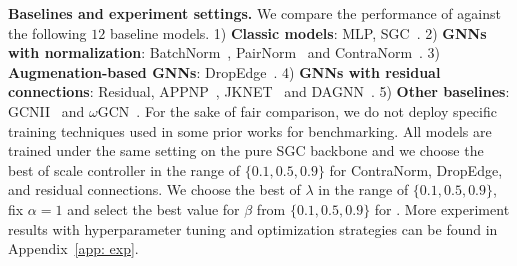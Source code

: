 \textbf{Baselines and experiment settings.}
We compare the performance of \ours against the following $12$ baseline models. 
1) \textbf{Classic models}: MLP, SGC~\citep{sgc}.
2) \textbf{GNNs with normalization}: BatchNorm~\citep{batchnorm}, PairNorm~\citep{pairnorm} and ContraNorm~\citep{contranorm}.
3) \textbf{Augmenation-based GNNs}: DropEdge~\citep{dropedge}.
4) \textbf{GNNs with residual connections}: Residual, APPNP~\citep{appap}, JKNET~\citep{jknet} and DAGNN~\citep{dagnn}. 
5) \textbf{Other baselines}: GCNII~\citep{GCNII} and \(\omega\)GCN~\citep{wGCN}.
For the sake of fair comparison, we do not deploy specific training techniques used in some prior works for benchmarking.
All models are trained under the same setting on the pure SGC backbone and we choose the best of scale controller in the range of $\{ 0.1, 0.5, 0.9\}$ for ContraNorm, DropEdge, and residual connections.
We choose the best of $\lambda$ in the range of $\{0.1, 0.5, 0.9\}$, fix $\alpha=1$ and select the best value for $\beta$ from $\{ 0.1, 0.5, 0.9\}$ for \ours. 
More experiment results with hyperparameter tuning and optimization strategies can be found in Appendix~\ref{app: exp}.

